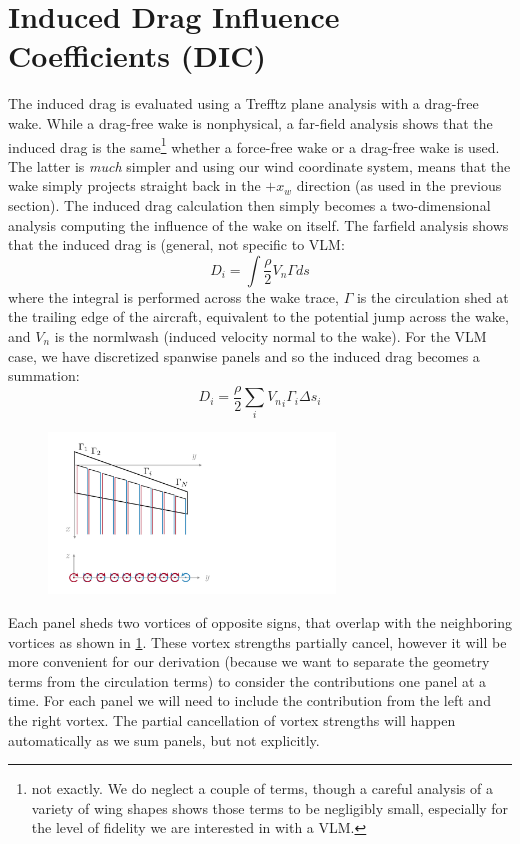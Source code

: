 \documentclass{article}
\begin{document}
\section{Induced Drag Influence Coefficients (DIC)}

The induced drag is evaluated using a Trefftz plane analysis with a drag-free wake.  While a drag-free wake is nonphysical, a far-field analysis shows that the induced drag is the same\footnote{not exactly.  We do neglect a couple of terms, though a careful analysis of a variety of wing shapes shows those terms to be negligibly small, especially for the level of fidelity we are interested in with a VLM.} whether a force-free wake or a drag-free wake is used.  The latter is \emph{much} simpler and using our wind coordinate system, means that the wake simply projects straight back in the $+x_w$ direction (as used in the previous section).  The induced drag calculation then simply becomes a two-dimensional analysis computing the influence of the wake on itself.  The farfield analysis shows that the induced drag is (general, not specific to VLM:
\begin{equation}
D_i = \int \frac{\rho}{2} V_n \Gamma ds
\end{equation}
where the integral is performed across the wake trace, $\Gamma$ is the circulation shed at the trailing edge of the aircraft, equivalent to the potential jump across the wake, and $V_n$ is the normlwash (induced velocity normal to the wake).  For the VLM case, we have discretized spanwise panels and so the induced drag becomes a summation:
\begin{equation}
D_i = \frac{\rho}{2} \sum_i  {V_n}_i \Gamma_i \Delta s_i
\label{eq:idrag}
\end{equation}

\begin{figure}[htbp]
\centering
\includegraphics[width=3.0in]{figs/vlmwake}
\caption{}
\label{fig:vlmwake}
\end{figure}

Each panel sheds two vortices of opposite signs, that overlap with the neighboring vortices as shown in \cref{fig:vlmwake}.  These vortex strengths partially cancel, however it will be more convenient for our derivation (because we want to separate the geometry terms from the circulation terms) to consider the contributions one panel at a time.  For each panel we will need to include the contribution from the left and the right vortex.  The partial cancellation of vortex strengths will happen automatically as we sum panels, but not explicitly.  
\end{document}
